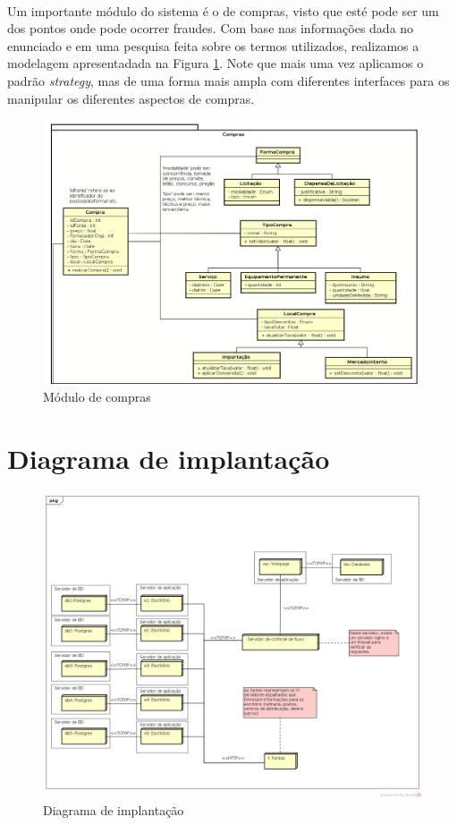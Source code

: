 \documentclass[a4paper,10pt]{article}
\begin{document}
\paragraph{}
Um importante módulo do sistema é o de compras, visto que esté pode ser um dos
pontos onde pode ocorrer fraudes. Com base nas informações dada no enunciado e
em uma pesquisa feita sobre os termos utilizados, realizamos a modelagem
apresentadada na Figura \ref{compras}. Note que mais uma vez aplicamos o padrão
\emph{strategy}, mas de uma forma mais ampla com diferentes interfaces para os
manipular os diferentes aspectos de compras.

\begin{figure}[ht]
  \centering
  \includegraphics[width=1\textwidth, keepaspectratio=true]{images/compras.png}
  \caption {Módulo de compras}
  \label {compras}
\end{figure}

\newpage
\section{Diagrama de implantação}

\begin{figure}[ht]
  \centering
  \includegraphics[width=1\textwidth, keepaspectratio=true]{images/DiagramaDeImplantacao.png}
  \caption {Diagrama de implantação}
  \label {di}
\end{figure}
\end{document}
